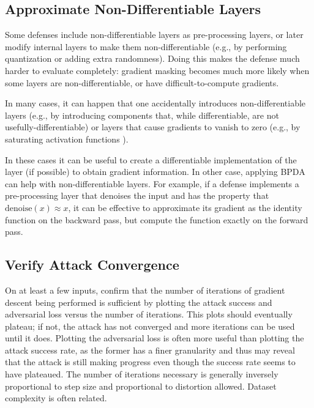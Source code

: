 \documentclass{article} %
\begin{document}
\subsection{Approximate Non-Differentiable Layers}
\label{sec:bpda}

Some defenses include non-differentiable layers as pre-processing
layers, or later modify internal layers to make them non-differentiable
(e.g., by performing quantization or adding extra randomness).
%
Doing this makes the defense much harder to evaluate completely:
gradient masking becomes much more likely when some layers are
non-differentiable, or have difficult-to-compute gradients.

In many cases, it can happen that one accidentally introduces non-differentiable
layers \citep{athalye2018obfuscated} (e.g., by introducing components
that, while differentiable, are not usefully-differentiable) or layers that
cause gradients to vanish to zero (e.g., by saturating
activation functions \citep{brendel2017comment,carlini2016defensive}).

In these cases it can be useful to create a
differentiable implementation of the layer (if possible) to
obtain gradient information.
%
In other case, applying BPDA \citep{athalye2018obfuscated} can help
with non-differentiable layers.
%
For example, if a defense implements a pre-processing layer that
denoises the input and has the property that $\text{denoise}(x) \approx x$,
it can be effective to approximate its gradient as the identity
function on the backward pass, but compute the function exactly
on the forward pass.


\subsection{Verify Attack Convergence}
\label{sec:converge}

On at least a few inputs, confirm
that the number of iterations of gradient descent being performed is
sufficient by plotting the attack success and adversarial loss versus the number of
iterations.
%
This plots should eventually plateau; if not, the attack
has not converged and more iterations can be used until
it does. Plotting the adversarial loss is often more useful than plotting the attack success rate, as the former has a finer granularity and thus may reveal that the attack is still making progress even though the success rate seems to have plateaued.
The number of
iterations necessary is generally inversely proportional to step size and
proportional to distortion allowed.
%
Dataset complexity is often related.
\end{document}
